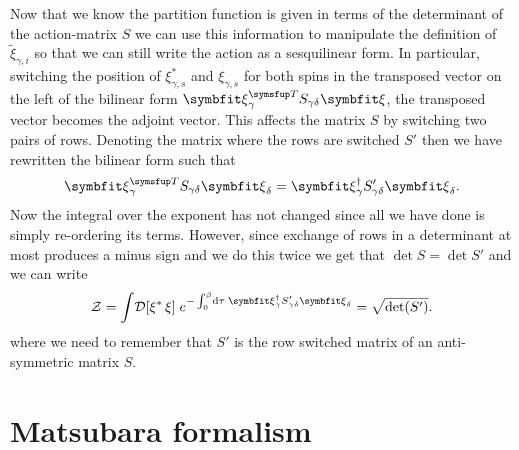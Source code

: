 Now that we know the partition function is given in terms of the determinant of the action-matrix $S$ we can use this information to manipulate the definition
of $\tilde{\xi}_{\gamma,i}$ so that we can still write the action as a sesquilinear form. In particular, switching the position of $\xi_{\gamma,s}^\ast$ and
$\xi_{\gamma,s}$ for both spins in the transposed vector on the left of the bilinear form $\v{\xi}_\gamma^\trans S_{\gamma\delta} \v{\xi}$, the transposed
vector becomes the adjoint vector. This affects the matrix $S$ by switching two pairs of rows. Denoting the matrix where the rows are switched $S'$ then
we have rewritten the bilinear form such that
\begin{equation}
    \label{eq:Field:Ferm:ExNambu:bilinearToSesqui}
    \v{\xi}_\gamma^\trans S_{\gamma\delta}\v{\xi}_\delta = \v{\xi}_\gamma^\dagger S'_{\gamma\delta}\v{\xi}_\delta.
\end{equation}
Now the integral over the exponent has not changed since all we have done is simply re-ordering its terms. However, since exchange of rows in a determinant
at most produces a minus sign and we do this twice we get that $\det S = \det S'$ and we can write
\begin{equation}
    \label{eq:Field:Ferm:ExNambu:partitionFunction:sesquilinear}
    \mathcal{Z} = \int\!\mathcal{D}[\xi^\ast\,\xi]\;e^{-\int_0^\beta\!\mathrm{d}\tau\;\v{\xi}_{\gamma}^\dagger S'_{\gamma\delta}\v{\xi}_{\delta}} = \sqrt{\det(S')}.
\end{equation}
where we need to remember that $S'$ is the row switched matrix of an anti-symmetric matrix $S$.

\section{Matsubara formalism}

